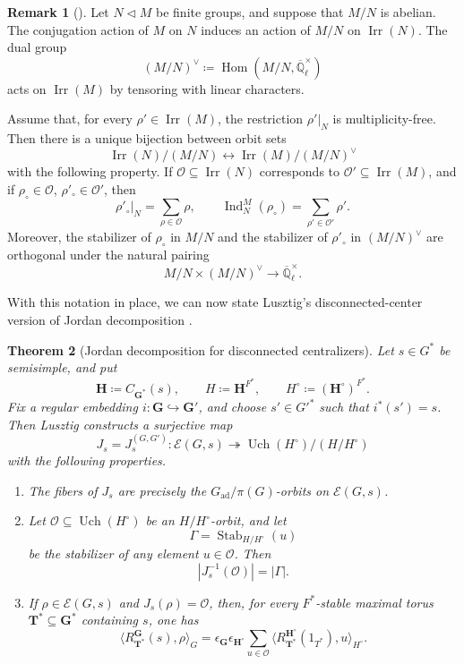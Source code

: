 \documentclass{amsart}
\theoremstyle{plain}
\numberwithin{equation}{section}
\newtheorem{theorem}{Theorem}[section]
\theoremstyle{definition}
\newtheorem{remark}[theorem]{Remark}
\newcommand{\cE}{\mathcal{E}}
\newcommand{\Ind}{\operatorname{Ind}}
\newcommand{\Qlcl}{\overline{\mathbb{Q}}_{\ell}}
\newcommand{\Hom}{\operatorname{Hom}}
\newcommand{\Irr}{\operatorname{Irr}}
\newcommand{\Uch}{\operatorname{Uch}}
\newcommand{\Stab}{\operatorname{Stab}}
\newcommand{\ad}{\operatorname{ad}}
\newcommand{\bG}{\mathbf{G}}
\newcommand{\bT}{\mathbf{T}}
\newcommand{\bH}{\mathbf{H}}
\begin{document}
\begin{remark}[{\cite[]{Lus88}}]
\label{rmk:multi-regular-embedding-action}
Let \(N\triangleleft M\) be finite groups, and suppose that \(M/N\) is
abelian.  The conjugation action of \(M\) on \(N\) induces an action of
\(M/N\) on \(\Irr(N)\).  The dual group
\[
(M/N)^\vee\coloneqq \Hom(M/N,\Qlcl^\times)
\]
acts on \(\Irr(M)\) by tensoring with linear characters.

Assume that, for every \(\rho'\in\Irr(M)\), the restriction \(\rho'|_N\) is
multiplicity-free.  Then there is a unique bijection between orbit sets
\[
\Irr(N)/(M/N)
\longleftrightarrow
\Irr(M)/(M/N)^\vee
\]
with the following property.  If \(\mathcal O\subseteq\Irr(N)\) corresponds to
\(\mathcal O'\subseteq\Irr(M)\), and if
\(\rho_\circ\in\mathcal O\), \(\rho'_\circ\in\mathcal O'\), then
\[
\rho'_\circ|_N=\sum_{\rho\in\mathcal O}\rho,
\qquad
\Ind_N^M(\rho_\circ)=\sum_{\rho'\in\mathcal O'}\rho'.
\]
Moreover, the stabilizer of \(\rho_\circ\) in \(M/N\) and the stabilizer of
\(\rho'_\circ\) in \((M/N)^\vee\) are orthogonal under the natural pairing
\[
M/N\times (M/N)^\vee\longrightarrow \Qlcl^\times.
\]
\end{remark}

With this notation in place, we can now state Lusztig's disconnected-center
version of Jordan decomposition \cite[Proposition~5.1]{Lus88}.
\begin{theorem}[Jordan decomposition for disconnected centralizers]
\label{thm:Lusztig-orbit-JD-disconnected-centralizers}
Let \(s\in G^*\) be semisimple, and put
\[
\bH\coloneqq C_{\bG^*}(s),
\qquad
H\coloneqq \bH^{F^*},
\qquad
H^\circ\coloneqq (\bH^\circ)^{F^*}.
\]
Fix a regular embedding \(i:\bG\hookrightarrow\bG'\), and choose
\(s'\in G'^*\) such that \(i^*(s')=s\).  Then Lusztig constructs a
surjective map
\[
J_s=J_s^{(G,G')}:
\cE(G,s)\twoheadrightarrow \Uch(H^\circ)/(H/H^\circ)
\]
with the following properties.

\begin{enumerate}
    \item The fibers of \(J_s\) are precisely the
    \(G_{\ad}/\pi(G)\)-orbits on \(\cE(G,s)\).

    \item Let \(\mathcal O\subseteq \Uch(H^\circ)\) be an
    \(H/H^\circ\)-orbit, and let
    \[
    \Gamma=\Stab_{H/H^\circ}(u)
    \]
    be the stabilizer of any element \(u\in\mathcal O\).  Then
    \[
    |J_s^{-1}(\mathcal O)|=|\Gamma|.
    \]

    \item If \(\rho\in \cE(G,s)\) and \(J_s(\rho)=\mathcal O\), then, for
    every \(F^*\)-stable maximal torus \(\bT^*\subseteq\bG^*\) containing
    \(s\), one has
    \[
    \big\langle R_{\bT^*}^{\bG}(s),\rho\big\rangle_G
    =
    \epsilon_{\bG}\epsilon_{\bH^\circ}
    \sum_{u\in\mathcal O}
    \big\langle
    R_{\bT^*}^{\bH^\circ}(1_{T^*}),u
    \big\rangle_{H^\circ}.
    \]
\end{enumerate}
\end{theorem}
\end{document}
